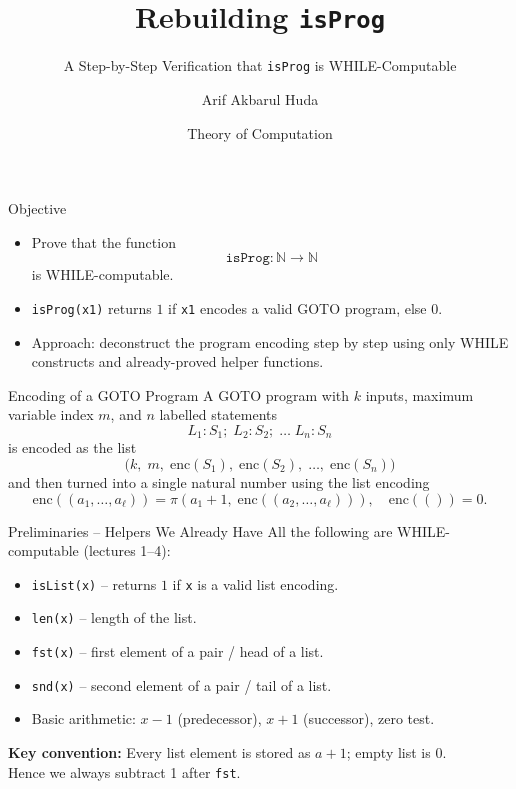 \documentclass[aspectratio=169]{beamer}
\begin{document}
	
	\begin{frame}
		\title{Rebuilding \texttt{isProg}}
		\subtitle{A Step-by-Step Verification that \texttt{isProg} is WHILE-Computable}
		\author{Arif Akbarul Huda}
		\date{Theory of Computation}
		\titlepage
	\end{frame}
	
	\begin{frame}{Objective}
		\begin{itemize}
			\item Prove that the function \[
			\texttt{isProg} : \mathbb{N} \to \mathbb{N}
			\] is WHILE-computable.
			\item \texttt{isProg(x1)} returns $1$ if \texttt{x1} encodes a valid GOTO program, else $0$.
			\item Approach: deconstruct the program encoding step by step using only WHILE constructs and already-proved helper functions.
		\end{itemize}
	\end{frame}
	
	\begin{frame}{Encoding of a GOTO Program}
		A GOTO program with $k$ inputs, maximum variable index $m$, and $n$ labelled statements
		\[
		L_1:S_1;\; L_2:S_2;\; \ldots\; L_n:S_n
		\]
		is encoded as the list
		\[
		\bigl(k,\; m,\; \mathrm{enc}(S_1),\; \mathrm{enc}(S_2),\; \ldots,\; \mathrm{enc}(S_n)\bigr)
		\]
		and then turned into a single natural number using the list encoding
		\[
		\mathrm{enc}((a_1,\dots,a_\ell)) = \pi(a_1+1,\; \mathrm{enc}((a_2,\dots,a_\ell))),\quad \mathrm{enc}(()) = 0.
		\]
	\end{frame}
	
	\begin{frame}{Preliminaries – Helpers We Already Have}
		All the following are WHILE-computable (lectures 1–4):
		\begin{itemize}
			\item \texttt{isList(x)} – returns $1$ if \texttt{x} is a valid list encoding.
			\item \texttt{len(x)} – length of the list.
			\item \texttt{fst(x)} – first element of a pair / head of a list.
			\item \texttt{snd(x)} – second element of a pair / tail of a list.
			\item Basic arithmetic: $x-1$ (predecessor), $x+1$ (successor), zero test.
		\end{itemize}
		\vspace{6pt}
		\textbf{Key convention:} Every list element is stored as $a+1$; empty list is $0$.\\[2pt]
		Hence we always subtract 1 after \texttt{fst}.
	\end{frame}
	
\end{document}
